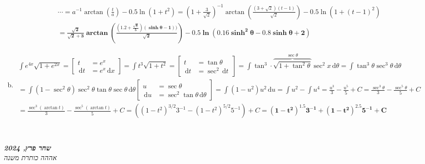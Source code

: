 \documentclass[]{article}
\newcommand\ndoc  {\dotfill \\ \vfil {\begin{center} {\textbf{\textit{שחר פרץ, 2024}} \\ \scriptsize \textit{אההה כותרת משנה}} \end{center}} \vfil	}
\newcommand\tant  {\tan \theta}
\newcommand\sect  {\sec^2}
\newcommand\dx    {\,\mathrm{d}x}
\newcommand\dt    {\,\mathrm{d}t}
\newcommand\dtt   {\,\mathrm{d}\theta}
\newcommand\du    {\,\mathrm{d}u}
\newcommand\pus[2]{\csb{\begin{aligned}
			u &= #1 \\
			\du &= #2
\end{aligned}}}
\newcommand\pts[2]{\csb{\begin{aligned}
t &= #1 \quad \\
\dt &= #2
\end{aligned}}}
\newcommand\ta    {\theta}
\newcommand\op    {^{-1}}
\newcommand\cl [1]    {\left ( #1 \right )}
\newcommand\csb[1]    {\left [ #1 \right ]}
\begin{document}
\begin{enumerate}[a.]
\begin{multline*}
				\cdots = a\op \arctan\cl{\frac{t}{a}} - 0.5\ln(1 + t^2) = \cl{1 + \frac{3}{\sqrt2}}\op \arctan \cl{\frac{(3 + \sqrt2)(t - 1)}{\sqrt2}} - 0.5 \ln (1 + (t - 1)^2) \\
				= \bm{\frac{\sqrt 2}{\sqrt 2 + 3} \arctan \cl{\frac{(1.2 + \frac{\sqrt8}{5})(\sinh\ta - 1))}{\sqrt2}} - 0.5\ln(0.16\sinh^2\ta - 0.8\sinh\ta + 2)}
			\end{multline*}
		\item 
			\begin{multline*}
				\int e^{4x}\sqrt{1 + e^{2x}} = \pts{e^{x}}{e^{x}\dx} = \int t^3\sqrt{1 + t^2} = \pts{\tant}{\sec^2\dt} = \int \tan^3 \cdot \overbrace{\sqrt{1 + \tan^2 \ta}}^{\sec\ta} \sec^2x \dtt = \int \tan^3\ta\sec^3\ta \dtt \\
				= \int (1 - \sec^2\ta) \sec^2\ta \tan\ta\sec\ta \dtt \pus{\sec \ta}{\sect\tant\dtt} = \int (1 - u^2)u^2 \du = \int u^2 - \int u^4 = \frac{u^3}{3} - \frac{u^5}{5} + C = \frac{\sec^3 \ta}{3} - \frac{\sec^5\ta}{5} +C \\
				= \frac{\sec^3(\arctan t)}{3} - \frac{\sec^5(\arctan t)}{5} + C = ((1 - t^2)^{3 / 2}3\op - (1 - t^2)^{5 / 2}5\op) + C = \bm{(1 - t^2)^{1.5}3\op + (1 - t^2)^{2.5}5\op + C}
			\end{multline*}
		\end{enumerate}
		
		\ndoc
\end{document}
